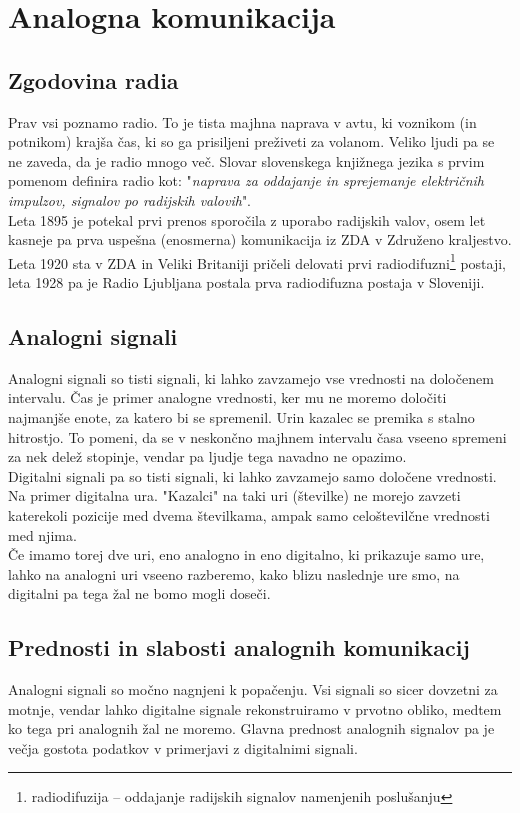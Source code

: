 \documentclass[12pt]{article}
\begin{document}
\section{Analogna komunikacija}
    \subsection{Zgodovina radia}
        Prav vsi poznamo radio. To je tista majhna naprava v avtu, ki 
        voznikom (in potnikom) krajša čas, ki so ga prisiljeni preživeti za
        volanom. Veliko ljudi pa se ne zaveda, da je radio mnogo več. Slovar
        slovenskega knjižnega jezika s prvim pomenom definira radio
        kot: "\textit{naprava za oddajanje in sprejemanje električnih 
        impulzov, signalov po radijskih valovih}". \cite{SSKJ-radio}\\
        Leta 1895 \cite{ppt} je potekal prvi prenos sporočila z uporabo
        radijskih valov, osem let kasneje pa prva uspešna (enosmerna) 
        komunikacija iz ZDA v Združeno kraljestvo. Leta 1920 sta v ZDA in 
        Veliki Britaniji pričeli delovati prvi radiodifuzni\footnote{
        radiodifuzija – oddajanje radijskih signalov namenjenih poslušanju} 
        postaji, leta 1928 pa je Radio Ljubljana postala prva radiodifuzna 
        postaja v Sloveniji.
    \subsection{Analogni signali}
        Analogni signali so tisti signali, ki lahko zavzamejo vse vrednosti
        na določenem intervalu. Čas je primer analogne vrednosti, ker mu ne
        moremo določiti najmanjše enote, za katero bi se spremenil. Urin
        kazalec se premika s stalno hitrostjo. To pomeni, da se v neskončno
        majhnem intervalu časa vseeno spremeni za nek delež stopinje, vendar
        pa ljudje tega navadno ne opazimo.\\
        Digitalni signali pa so tisti signali, ki lahko zavzamejo samo 
        določene vrednosti. Na primer digitalna ura. "Kazalci" na taki uri 
        (številke) ne morejo zavzeti katerekoli pozicije med dvema 
        številkama, ampak samo celoštevilčne vrednosti med njima.\\
        Če imamo torej dve uri, eno analogno in eno digitalno, ki prikazuje
        samo ure, lahko na analogni uri vseeno razberemo, kako blizu 
        naslednje ure smo, na digitalni pa tega žal ne bomo mogli doseči.
    \subsection{Prednosti in slabosti analognih komunikacij}
        Analogni signali so močno nagnjeni k popačenju. Vsi signali so sicer 
        dovzetni za motnje, vendar lahko digitalne signale rekonstruiramo v 
        prvotno obliko, medtem ko tega pri analognih žal ne moremo. Glavna 
        prednost analognih signalov pa je večja gostota podatkov v primerjavi z
        digitalnimi signali.
\end{document}
